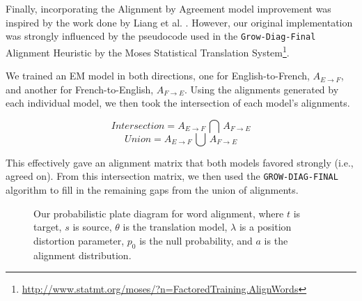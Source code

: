 \documentclass[twoside,twocolumn]{article}
\begin{document}
Finally, incorporating the Alignment by Agreement model improvement was
inspired by the work done by Liang et al. \cite{liang2006alignment}. However,
our original implementation was strongly influenced by the pseudocode used in
the \texttt{Grow-Diag-Final} Alignment Heuristic by the Moses Statistical
Translation
System\footnote{\url{http://www.statmt.org/moses/?n=FactoredTraining.AlignWords}}.

We trained an EM model in both directions, one for English-to-French,
$A_{E \rightarrow F}$, and another for French-to-English,
$A_{F \rightarrow E}$. Using the alignments generated by each individual model,
we then took the intersection of each model's alignments.

\begin{equation}
Intersection = A_{E \rightarrow F} \, \bigcap \, A_{F \rightarrow E}
\end{equation}
\begin{equation}
Union = A_{E \rightarrow F} \, \bigcup \, A_{F \rightarrow E}
\end{equation}

This effectively gave an alignment matrix that both models favored strongly
(i.e., agreed on). From this intersection matrix, we then used the
\texttt{GROW-DIAG-FINAL} algorithm to fill in the remaining gaps from the union
of alignments.

\begin{figure}
\centering
{}
\caption{Our probabilistic plate diagram for word alignment, where $t$ is
target, $s$ is source, $\theta$ is the translation model, $\lambda$ is a
position distortion parameter, $p_0$ is the null probability, and $a$ is the
alignment distribution.}
\end{figure}
\end{document}
